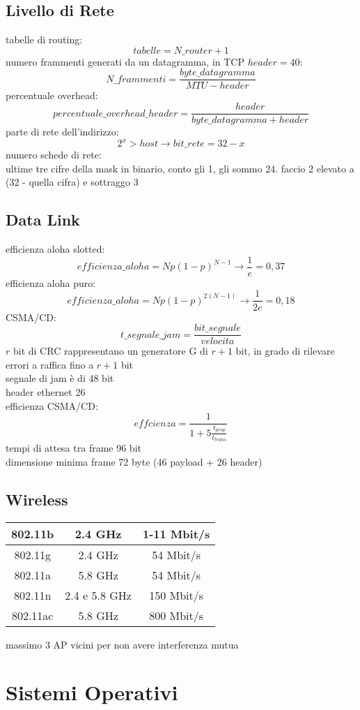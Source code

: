 \documentclass[a4paper,12pt, oneside]{book}
\begin{document}
\section{Livello di Rete}
tabelle di routing:
$$tabelle=N\_router+1$$
numero frammenti generati da un datagramma, in TCP $header=40$:
$$N\_frammenti=\frac{byte\_datagramma}{MTU-header}$$
percentuale overhead:
$$percentuale\_overhead\_header=\frac{header}{byte\_datagramma+header}$$
parte di rete dell'indirizzo:
$$2^x>host\to bit\_rete=32-x$$
numero schede di rete:
\\ ultime tre cifre della mask in binario, conto gli 1, gli sommo 24. faccio 2 elevato a (32 - quella cifra) e sottraggo 3\\
\section{Data Link}
efficienza aloha slotted:
$$efficienza\_aloha=Np(1-p)^{N-1}\to \frac{1}{e}=0,37$$
efficienza aloha puro:
$$efficienza\_aloha=Np(1-p)^{2(N-1)}\to \frac{1}{2e}=0,18$$
CSMA/CD:
$$t\_segnale\_jam=\frac{bit\_segnale}{velocita}$$
$r$ bit di CRC rappresentano un generatore G di
$r + 1$ bit, in grado di rilevare errori a raffica fino
a $r + 1$ bit\\
segnale di jam è di 48 bit\\
header ethernet 26\\
efficienza CSMA/CD:
$$effcienza= \frac{1}{1+5\frac{t_{prop}}{t_{trans}}}$$
tempi di attesa tra frame 96 bit\\
dimensione minima frame 72 byte (46 payload + 26 header)
\section{Wireless}
\begin{center}
	\begin{tabular}{|c|c|c|}
		\hline
		802.11b  & 2.4 GHz       & 1-11 Mbit/s \\
		\hline
		802.11g  & 2.4 GHz       & 54 Mbit/s   \\
		\hline
		802.11a  & 5.8 GHz       & 54 Mbit/s   \\
		\hline
		802.11n  & 2.4 e 5.8 GHz & 150 Mbit/s  \\
		\hline
		802.11ac & 5.8 GHz       & 800 Mbit/s  \\
		\hline
	\end{tabular}
\end{center}
massimo 3 AP vicini per non avere interferenza mutua
\chapter{Sistemi Operativi}
\end{document}
